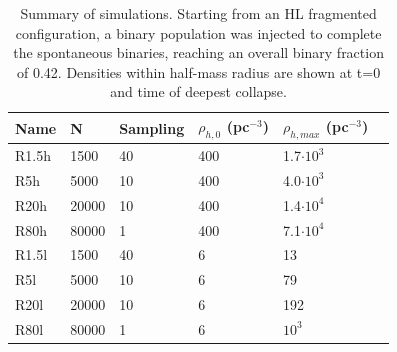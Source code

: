 %

\begin{table}
\begin{center}
\caption{Summary of simulations. Starting from an HL fragmented configuration, a binary population was injected to complete the spontaneous binaries, reaching an overall binary fraction of 0.42. Densities within half-mass radius are shown at t=0 and time of deepest collapse.}
\label{Tab:6_models}
\begin{tabularx}{0.6\textwidth}{XXlXXX}
\hline
Name & N & Sampling & $\rho_{h,0}$ (pc$^{-3}$) & $\rho_{h,max}$ (pc$^{-3}$)  \\
\hline
R1.5h & 1500 & 40 & 400 & 1.7$\cdot10^3$\\
R5h  &  5000 & 10 & 400 & 4.0$\cdot10^3$\\
R20h &  20000 & 10 & 400 & 1.4$\cdot10^4$\\
R80h &  80000 & 1 & 400 & 7.1$\cdot10^4$\\
R1.5l &  1500 & 40 & 6 & 13\\
R5l &  5000 & 10 & 6 & 79 \\
R20l &  20000 & 10 & 6 & 192 \\
R80l &  80000 & 1 & 6  & $10^3$\\
\hline
\end{tabularx}
\end{center}
\end{table}


